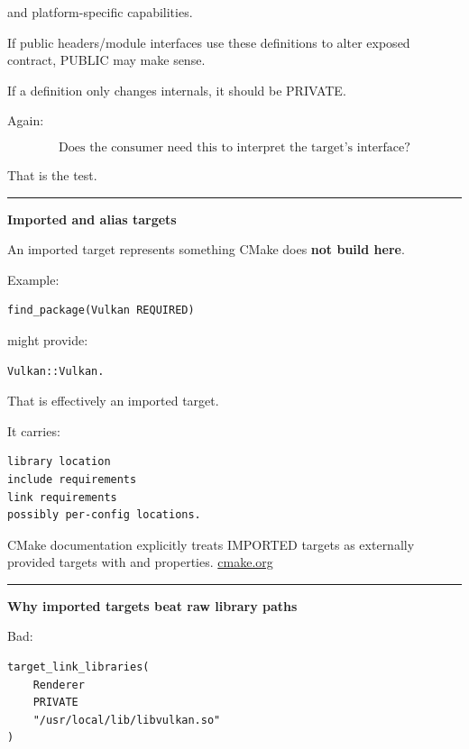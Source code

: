 and platform-specific capabilities.

If public headers/module interfaces use these definitions to alter exposed contract, PUBLIC may make sense.

If a definition only changes  internals, it should be PRIVATE.

Again:

\[
\text{Does the consumer need this to interpret the target's interface?}
\]

That is the test.

\begin{center}\rule{0.5\linewidth}{0.5pt}\end{center}

\textbf{Imported and alias targets}

An imported target represents something CMake does \textbf{not build here}.

Example:

\begin{verbatim}
find_package(Vulkan REQUIRED)
\end{verbatim}

might provide:

\begin{verbatim}
Vulkan::Vulkan.
\end{verbatim}

That is effectively an imported target.

It carries:

\begin{verbatim}
library location
include requirements
link requirements
possibly per-config locations.
\end{verbatim}

CMake documentation explicitly treats IMPORTED targets as externally provided targets with  and  properties. \href{https://cmake.org/cmake/help/latest/command/add_library.html?utm_source=chatgpt.com}{cmake.org}

\begin{center}\rule{0.5\linewidth}{0.5pt}\end{center}

\textbf{Why imported targets beat raw library paths}

Bad:

\begin{verbatim}
target_link_libraries(
    Renderer
    PRIVATE
    "/usr/local/lib/libvulkan.so"
)
\end{verbatim}

